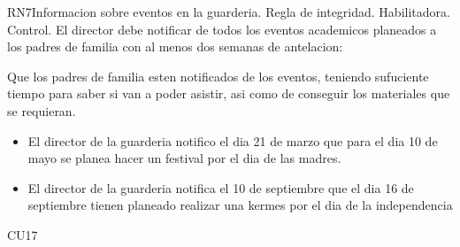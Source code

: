 \begin{BussinesRule}{RN7}{Informacion sobre eventos en la guarderia.}
	\BRitem[Tipo:] Regla de integridad.
	\BRitem[Clase:] Habilitadora. 
	\BRitem[Nivel:] Control. %
	\BRitem[Descripción:] El director debe notificar de todos los eventos academicos planeados a los padres de familia con al menos dos semanas de antelacion:
		
	\BRitem[Motivacion:] Que los padres de familia esten notificados de los eventos, teniendo sufuciente tiempo para saber si van a poder asistir, asi como de conseguir los materiales que se requieran.
	        \begin{itemize}
	            \item El director de la guarderia notifico el dia 21 de marzo que para el dia 10 de mayo se planea hacer un festival por el dia de las madres.
	        \end{itemize}
	        \begin{itemize}
	            \item El director de la guarderia notifica el 10 de septiembre que el dia 16 de septiembre tienen planeado realizar una kermes por el dia de la independencia
	        \end{itemize}
	 CU17 
\end{BussinesRule}

